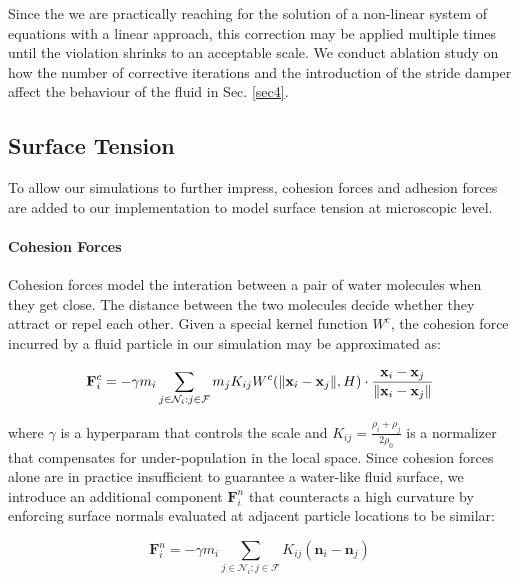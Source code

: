 \documentclass[
	11pt, 
	DIV10,
	ngerman,
	a4paper, 
	oneside, 
	headings=normal, 
	captions=tableheading,
	final, 
	numbers=noenddot
]{scrartcl}
\DeclarePairedDelimiter{\norm}{\lVert}{\rVert}
\begin{document}
Since the we are practically reaching for the solution of a non-linear system of equations with a linear approach, this correction may be applied multiple times until the violation shrinks to an acceptable scale. We conduct ablation study on how the number of corrective iterations and the introduction of the stride damper affect the behaviour of the fluid in Sec. \ref{sec4}.

\subsection{Surface Tension}

To allow our simulations to further impress, cohesion forces and adhesion forces are added to our implementation to model surface tension at microscopic level.

\paragraph{Cohesion Forces}

Cohesion forces model the interation between a pair of water molecules when they get close. The distance between the two molecules decide whether they attract or repel each other. Given a special kernel function $ W^{c} $, the cohesion force incurred by a fluid particle in our simulation may be approximated as:

\begin{equation}
	\label{eq25}
	\mathbf{F}_{i}^{c} = - \gamma m_{i} \sum_{j \in \mathcal{N}_{i}:j \in \mathcal{F}} m_j K_{ij} W^{c}(\norm{\mathbf{x}_{i} - \mathbf{x}_{j}}, H) \cdot \frac{\mathbf{x}_{i} - \mathbf{x}_{j}}{\norm{\mathbf{x}_{i} - \mathbf{x}_{j}}}
\end{equation}

where $ \gamma $ is a hyperparam that controls the scale and $ K_{ij} = \frac{\rho_{i} + \rho_{j}}{2\rho_{0}} $ is a normalizer that compensates for under-population in the local space. Since cohesion forces alone are in practice insufficient to guarantee a water-like fluid surface, we introduce an additional component $ \mathbf{F}_{i}^{n} $ that counteracts a high curvature by enforcing surface normals evaluated at adjacent particle locations to be similar:

\begin{equation}
	\label{eq26}
	\mathbf{F}_{i}^{n} = - \gamma m_{i} \sum_{j \in \mathcal{N}_{i}:j \in \mathcal{F}} K_{ij} (\mathbf{n}_{i} - \mathbf{n}_{j})
\end{equation}
\end{document}
